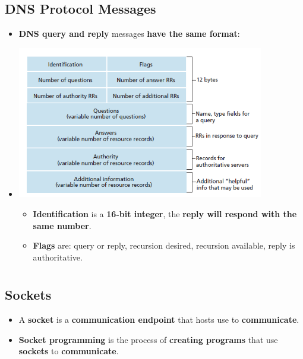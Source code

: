 \documentclass[16pt]{article}
\begin{document}
    \subsection*{DNS Protocol Messages}
    \begin{itemize}
        \item \textbf{DNS query and reply} messages \textbf{have the same format}:
        \item[] \includegraphics[width=407px]{images/DNS-Message.png}
        \begin{itemize}
            \item \textbf{Identification} is a \textbf{16-bit integer}, the \textbf{reply will respond with the same number}.
            \item \textbf{Flags} are: query or reply, recursion desired, recursion available, reply is authoritative.
        \end{itemize}        
    \end{itemize}

    \section*{}

    \subsection*{Sockets}
    \begin{itemize}
        \item A \textbf{socket} is a \textbf{communication endpoint} that hosts use to \textbf{communicate}.
        \item \textbf{Socket programming} is the process of \textbf{creating programs} that use \textbf{sockets} to \textbf{communicate}.
    \end{itemize}
\end{document}
